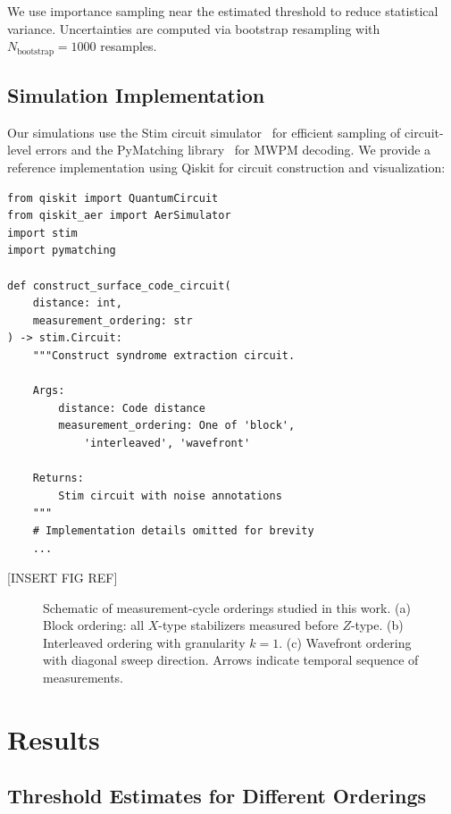 \documentclass[
    reprint,
    aps,
    prx,
    superscriptaddress,
    longbibliography
]{revtex4-2}
\begin{document}
We use importance sampling near the estimated threshold to reduce statistical variance. Uncertainties are computed via bootstrap resampling with $N_{\text{bootstrap}} = 1000$ resamples.

\subsection{Simulation Implementation}
\label{subsec:implementation}

Our simulations use the Stim circuit simulator~\cite{Gidney2021Stim} for efficient sampling of circuit-level errors and the PyMatching library~\cite{Higgott2023Sparse} for MWPM decoding. We provide a reference implementation using Qiskit for circuit construction and visualization:

\begin{verbatim}
from qiskit import QuantumCircuit
from qiskit_aer import AerSimulator
import stim
import pymatching

def construct_surface_code_circuit(
    distance: int,
    measurement_ordering: str
) -> stim.Circuit:
    """Construct syndrome extraction circuit.
    
    Args:
        distance: Code distance
        measurement_ordering: One of 'block', 
            'interleaved', 'wavefront'
    
    Returns:
        Stim circuit with noise annotations
    """
    # Implementation details omitted for brevity
    ...
\end{verbatim}

[INSERT FIG REF]

\begin{figure}[t]
    \caption{Schematic of measurement-cycle orderings studied in this work. (a) Block ordering: all $X$-type stabilizers measured before $Z$-type. (b) Interleaved ordering with granularity $k=1$. (c) Wavefront ordering with diagonal sweep direction. Arrows indicate temporal sequence of measurements.}
    \label{fig:ordering_schematics}
\end{figure}

\section{Results}
\label{sec:results}

\subsection{Threshold Estimates for Different Orderings}
\label{subsec:threshold_estimates}
\end{document}
